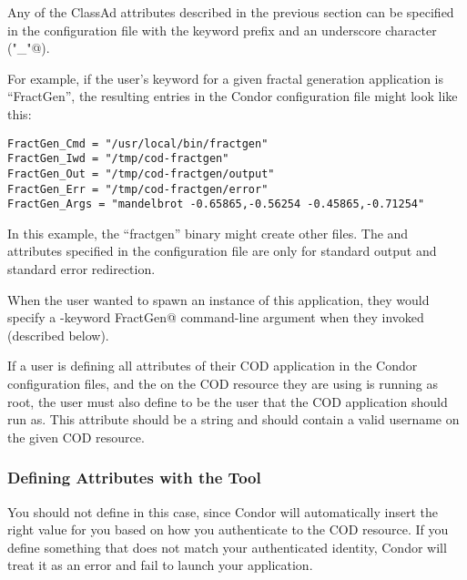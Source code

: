Any of the ClassAd attributes described in the previous section can be
specified in the configuration file with the keyword prefix and an
underscore character (\verb@"_"@).

For example, if the user's keyword for a given fractal generation
application is ``FractGen'', the resulting entries in the Condor
configuration file might look like this:

\begin{verbatim}
FractGen_Cmd = "/usr/local/bin/fractgen"
FractGen_Iwd = "/tmp/cod-fractgen"
FractGen_Out = "/tmp/cod-fractgen/output"
FractGen_Err = "/tmp/cod-fractgen/error"
FractGen_Args = "mandelbrot -0.65865,-0.56254 -0.45865,-0.71254"
\end{verbatim}

In this example, the ``fractgen'' binary might create other files.
The  and  attributes specified in the
configuration file are only for standard output and standard error
redirection.

When the user wanted to spawn an instance of this application, they
would specify a \verb@-keyword FractGen@ command-line argument when
they invoked  (described below).

\Note If a user is defining all attributes of their COD application in
the Condor configuration files, and the  on the COD
resource they are using is running as root, the user must also define
 to be the user that the COD application should run as.
This attribute should be a string and should contain a valid username
on the given COD resource.


\subsubsection{\label{sec:cod-command-line-attrs}
Defining Attributes with the  Tool} 

\Todo

\Note You should not define  in this case, since Condor
will automatically insert the right value for you based on how you
authenticate to the COD resource.  
If you define something that does not match your authenticated
identity, Condor will treat it as an error and fail to launch your
application. 


